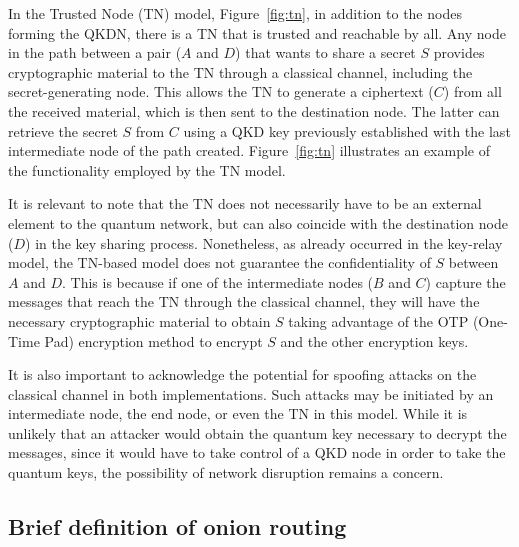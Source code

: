 \documentclass[conference]{IEEEtran}
\begin{document}
In the Trusted Node (TN) model, Figure~\ref{fig:tn}, in addition to the nodes forming the QKDN, there is a TN that is trusted and reachable by all. Any node in the path between a pair ($A$ and $D$) that wants to share a secret $S$ provides cryptographic material to the TN through a classical channel, including the secret-generating node. This allows the TN to generate a ciphertext ($C$) from all the received material, which is then sent to the destination node. The latter can retrieve the secret $S$ from $C$ using a QKD key previously established with the last intermediate node of the path created. Figure~\ref{fig:tn} illustrates an example of the functionality employed by the TN model.

It is relevant to note that the TN does not necessarily have to be an external element to the quantum network, but can also coincide with the destination node ($D$) in the key sharing process. Nonetheless, as already occurred in the key-relay model, the TN-based model does not guarantee the confidentiality of $S$ between $A$ and $D$. This is because if one of the intermediate nodes ($B$ and $C$) capture the messages that reach the TN through the classical channel, they will have the necessary cryptographic material to obtain $S$ taking advantage of the OTP (One-Time Pad) encryption method to encrypt $S$ and the other encryption keys.

It is also important to acknowledge the potential for spoofing attacks on the classical channel in both implementations. Such attacks may be initiated by an intermediate node, the end node, or even the TN in this model. While it is unlikely that an attacker would obtain the quantum key necessary to decrypt the messages, since it would have to take control of a QKD node in order to take the quantum keys, the possibility of network disruption remains a concern.

\subsection{Brief definition of onion routing \label{sec:onion}}
\end{document}
